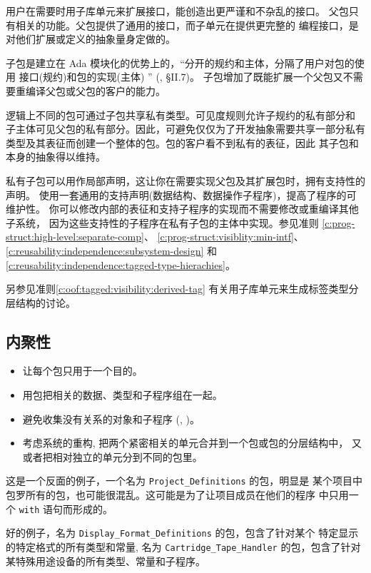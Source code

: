 \begin{blockindent}
用户在需要时用子库单元来扩展接口，能创造出更严谨和不杂乱的接口。
父包只有相关的功能。父包提供了通用的接口，而子单元在提供更完整的
编程接口，是对他们扩展或定义的抽象量身定做的。

子包是建立在 Ada 模块化的优势上的，``分开的规约和主体，分隔了用户对包的使用
接口(规约)和包的实现(主体) '' (\cite{rational95}, \S{}II.7)。
子包增加了既能扩展一个父包又不需要重编译父包或父包的客户的能力。

逻辑上不同的包可通过子包共享私有类型。可见度规则允许子规约的私有部分和
子主体可见父包的私有部分。因此，可避免仅仅为了开发抽象需要共享一部分私有
类型及其表征而创建一个整体的包。包的客户看不到私有的表征，因此
其子包和本身的抽象得以维持。

私有子包可以用作局部声明，这让你在需要实现父包及其扩展包时，拥有支持性的声明。
使用一套通用的支持声明(数据结构、数据操作子程序)，提高了程序的可维护性。
你可以修改内部的表征和支持子程序的实现而不需要修改或重编译其他子系统，
因为这些支持性的子程序在私有子包的主体中实现。参见准则
\ref{c:prog-struct:high-level:separate-comp}、
\ref{c:prog-struct:visiblity:min-intf}、
\ref{c:reusability:independence:subsystem-design} 和
\ref{c:reusability:independence:tagged-type-hierachies}。

另参见准则\ref{c:oof:tagged:visibility:derived-tag}
有关用子库单元来生成标签类型分层结构的讨论。
\end{blockindent}

\subsection{内聚性}
\label{c:prog-structure:high-level:cohesion}

\begin{itemize}
\item 让每个包只用于一个目的。
\item 用包把相关的数据、类型和子程序组在一起。
\item 避免收集没有关系的对象和子程序 (\cite{nasa87}, \cite{nissen84})。
\item 考虑系统的重构, 把两个紧密相关的单元合并到一个包或包的分层结构中，
又或者把相对独立的单元分到不同的包里。
\end{itemize}

\begin{blockindent}
这是一个反面的例子，一个名为 \texttt{Project\_Definitions} 的包，明显是
某个项目中包罗所有的包，也可能很混乱。这可能是为了让项目成员在他们的程序
中只用一个 \texttt{with} 语句而形成的。

好的例子，名为 \texttt{Display\_Format\_Definitions} 的包，包含了针对某个
特定显示的特定格式的所有类型和常量, 名为 \texttt{Cartridge\_Tape\_Handler}
的包，包含了针对某特殊用途设备的所有类型、常量和子程序。
\end{blockindent}

